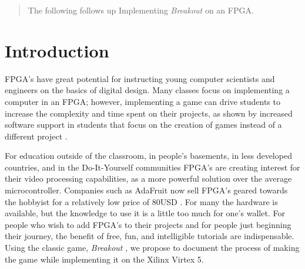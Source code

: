 \documentclass[conference]{IEEEtran}
\begin{document}
\begin{abstract}
The following follows up Implementing \emph{Breakout} on an FPGA.
\end{abstract}





%
\IEEEpeerreviewmaketitle



\section{Introduction}
FPGA's have great potential for instructing young computer scientists and engineers on the basics of digital design. Many classes focus on implementing a computer in an FPGA; however, implementing a game can drive students to increase the complexity and time spent on their projects, as shown by increased software support in students that focus on the creation of games instead of a different project \cite{Brunvand:2011}.

For education outside of the classroom, in people's basements, in less developed countries, and in the Do-It-Yourself communities FPGA's are creating interest for their video processing capabilities, as a more powerful solution over the average microcontroller. Companies such as AdaFruit now sell FPGA's geared towards the hobbyist for a relatively low price of 80USD \cite{Ada:2013}. For many the hardware is available, but the knowledge to use it is a little too much for one's wallet. For people who wish to add FPGA's to their projects and for people just beginning their journey, the benefit of free, fun, and intelligible tutorials are indispensable. Using the classic game, \emph{Breakout} \cite{Goldberg:2009}, we propose to document the process of making the game while implementing it on the Xilinx Virtex 5.\\
\end{document}
